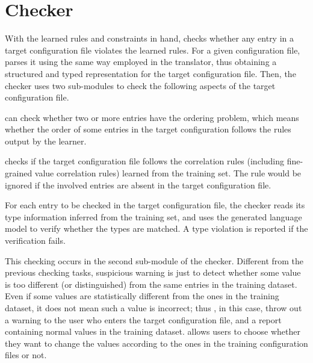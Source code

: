 
\section{Checker}
\label{sec-checker}

With the learned rules and constraints in hand,
\app checks whether any entry in a target configuration file
violates the learned rules.
For a given configuration file, \app parses it using the same
way employed in the translator, thus obtaining a structured
and typed representation for the target configuration file.
Then, the checker uses two sub-modules to check the
following aspects of the target configuration file.

\app can check whether two or more entries have the ordering 
problem, which means whether the order of some entries in the 
target configuration follows the rules output by the learner.

\app checks if the target configuration file follows the 
correlation rules (including fine-grained value correlation rules)
learned from the training set. The rule would be ignored 
if the involved entries are absent in the target configuration file.

For each entry to be checked in the target configuration file,
the checker reads its type information inferred from the training set,
and uses the generated language model to verify whether the types
are matched. A type violation is reported if the verification
fails.

This checking occurs in the second sub-module of the checker.
Different from the previous checking tasks,
suspicious warning is just to detect whether some value
is too different (or distinguished) from the same entries in the
training dataset. Even if some values are statistically different
from the ones in the training dataset, 
it does not mean such a value is incorrect;
thus \app, in this case, throw out a warning to the user who
enters the target configuration file, and a report containing 
normal values in the training dataset.
\app allows users to choose whether they want to change 
the values according to the ones in the training configuration
files or not.
